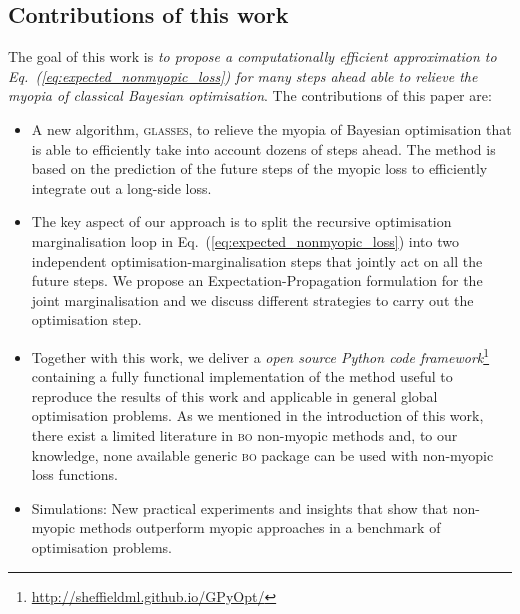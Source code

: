 \documentclass[twoside]{article}
\newcommand{\acr}[1]{\textsc{#1}\xspace}
\newcommand{\us}{\acr{glasses}}
\newcommand{\bo}{\acr{bo}}
\begin{document}
\subsection{Contributions of this work}

The goal of this work is \emph{to propose a computationally efficient approximation to Eq.~(\ref{eq:expected_nonmyopic_loss}) for many steps ahead able to relieve the myopia of classical Bayesian optimisation}. The contributions of this paper are:
\begin{itemize}
\item A new algorithm, \us, to relieve the myopia of Bayesian optimisation that is able to efficiently take into account dozens of steps ahead. The method is based on the prediction of the future steps of the myopic loss to efficiently integrate out a long-side loss. 
\item The key aspect of our approach is to split the recursive optimisation marginalisation loop in Eq.~(\ref{eq:expected_nonmyopic_loss}) into two independent optimisation-marginalisation steps that jointly act on all the future steps. We propose an Expectation-Propagation formulation for the joint marginalisation and we discuss different strategies to carry out the optimisation step.
\item Together with this work, we deliver a \emph{open source Python code framework}\footnote{\url{http://sheffieldml.github.io/GPyOpt/}} containing a fully functional  implementation of the method useful to reproduce the results of this work and applicable in general global optimisation problems. As we mentioned in the introduction of this work, there exist a limited literature in \bo non-myopic methods and, to our knowledge, none available generic \bo package can be used with non-myopic loss functions. 
\item Simulations: New practical experiments and insights that show that non-myopic methods outperform myopic approaches in a benchmark of optimisation problems. 
\end{itemize}
\end{document}

